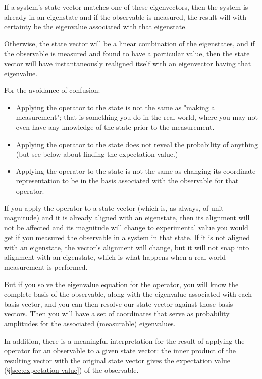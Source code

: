 If a system's state vector matches one of these eigenvectors, then the system is already in an eigenstate and if the observable is measured, the result will with certainty be the eigenvalue associated with that eigenstate.

Otherwise, the state vector will be a linear combination of the eigenstates, and if the observable is measured and found to have a particular value, then the state vector will have instantaneously realigned itself with an eigenvector having that eigenvalue.

For the avoidance of confusion:

\begin{itemize}
  \item Applying the operator to the state is not the same as "making a measurement"; that is something you do in the real world, where you may not even have any knowledge of the state prior to the measurement.
  \item Applying the operator to the state does not reveal the probability of anything (but see below about finding the expectation value.)
  \item Applying the operator to the state is not the same as changing its coordinate representation to be in the basis associated with the observable for that operator.
\end{itemize}

If you apply the operator to a state vector (which is, as always, of unit magnitude) and it is already aligned with an eigenstate, then its alignment will not be affected and its magnitude will change to experimental value you would get if you measured the observable in a system in that state. If it is not aligned with an eigenstate, the vector's alignment will change, but it will not snap into alignment with an eigenstate, which is what happens when a real world measurement is performed.

But if you solve the eigenvalue equation for the operator, you will know the complete basis of the observable, along with the eigenvalue associated with each basis vector, and you can then resolve our state vector against those basis vectors. Then you will have a set of coordinates that serve as probability amplitudes for the associated (measurable) eigenvalues.

In addition, there is a meaningful interpretation for the result of applying the operator for an observable to a given state vector: the inner product of the resulting vector with the original state vector gives the expectation value (§\ref{sec:expectation-value}) of the observable.

